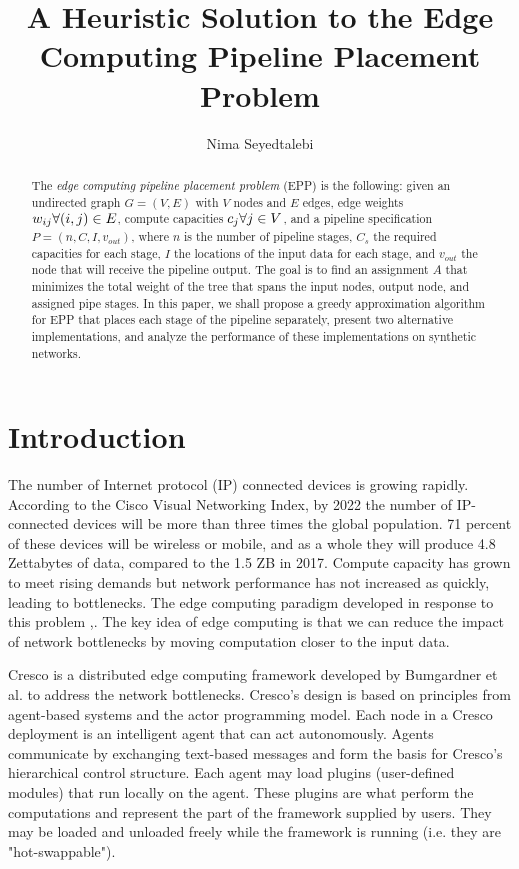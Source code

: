 \documentclass{article}
\author{Nima Seyedtalebi}
\title{A Heuristic Solution to the Edge Computing Pipeline Placement Problem}
\newcommand{\forallv}[1]{\ensuremath{\forall #1 \in V}}
\newcommand{\foralle}[2]{\ensuremath{\forall (#1,#2) \in E }}
\begin{document}
	\maketitle
	\begin{abstract}
		The \textit{edge computing pipeline placement problem} (EPP) is the following: given an undirected graph $G=(V,E)$ with $V$ nodes and $E$ edges, edge weights $w_{ij} \space \foralle{i}{j}$, compute capacities $c_{j} \space \forallv{j}$, and a pipeline specification $P = (n,C,I,v_{out})$, where  $n$ is the number of pipeline stages, $C_{s}$ the required capacities for each stage, $I$ the locations of the input data for each stage, and $v_{out}$ the node that will receive the pipeline output. The goal is to find an assignment $A$ that minimizes the total weight of the tree that spans the input nodes, output node, and assigned pipe stages. In this paper, we shall propose a greedy approximation algorithm for EPP that places each stage of the pipeline separately, present two alternative implementations, and analyze the performance of these implementations on synthetic networks.
	\end{abstract}
	
	\section{Introduction}
	The number of Internet protocol (IP) connected devices is growing rapidly. According to the Cisco Visual Networking Index, by 2022 the number of IP-connected devices will be more than three times the global population. 71 percent of these devices will be wireless or mobile, and as a whole they will produce 4.8 Zettabytes of data, compared to the 1.5 ZB in 2017.\cite{ciscoVNI} Compute capacity has grown to meet rising demands but network performance has not increased as quickly, leading to bottlenecks. The edge computing paradigm developed in response to this problem \cite{edgeEmerge},\cite{edgePromise}. The key idea of edge computing is that we can reduce the impact of network bottlenecks by moving computation closer to the input data.
	
	Cresco is a distributed edge computing framework developed by Bumgardner et al.\cite{bumgardner2016cresco} to address the network bottlenecks. Cresco's design is based on principles from agent-based systems and the actor programming model. Each node in a Cresco deployment is an intelligent agent that can act autonomously. Agents communicate by exchanging text-based messages and form the basis for Cresco's hierarchical control structure. Each agent may load plugins (user-defined modules) that run locally on the agent. These plugins are what perform the computations and represent the part of the framework supplied by users. They may be loaded and unloaded freely while the framework is running (i.e. they are "hot-swappable").
	
\end{document}
